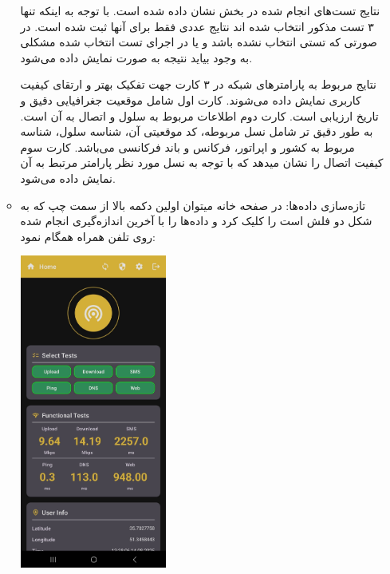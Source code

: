 \begin{itemize}
\begin{itemize}
\begin{center}
		\end{center} 
                نتایج تست‌های انجام شده در بخش  نشان داده شده است. با توجه به اینکه تنها ۳ تست مذکور انتخاب شده اند نتایج عددی فقط برای آنها ثبت شده است. در صورتی که تستی انتخاب نشده باشد و یا در اجرای تست انتخاب شده مشکلی به وجود بیاید نتیجه به صورت  نمایش داده می‌شود.

                نتایج مربوط به پارامترهای شبکه در ۳ کارت جهت تفکیک بهتر و ارتقای کیفیت کاربری نمایش داده می‌شوند. کارت اول  شامل موقعیت جغرافیایی دقیق و تاریخ ارزیابی است. کارت دوم  اطلاعات مربوط به سلول و اتصال به آن است. به طور دقیق تر شامل نسل مربوطه، کد موقعیتی آن، شناسه سلول، شناسه مربوط به کشور و اپراتور، فرکانس و باند فرکانسی می‌باشد. کارت سوم  کیفیت اتصال را نشان میدهد که با توجه به نسل مورد نظر پارامتر مرتبط به آن نمایش داده می‌شود.
        
		\item  تازه‌سازی داده‌ها:
		در صفحه خانه میتوان اولین دکمه بالا از سمت چپ که به شکل دو فلش است را کلیک کرد و داده‌ها را با آخرین اندازه‌گیری انجام شده روی تلفن همراه همگام نمود:
		\begin{center}
			\includegraphics[width=0.4\textwidth]{images/home-filled.jpg}
		\end{center}


\end{itemize}
\end{itemize}
